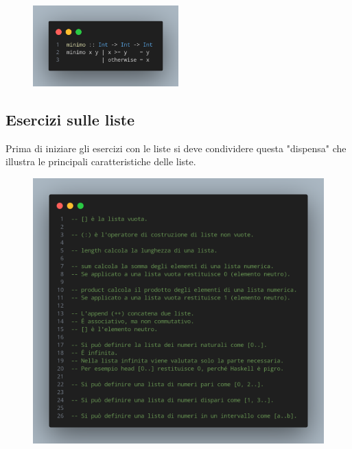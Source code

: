 \begin{figure}[!h]
    \centering
    \includegraphics[width=0.5\textwidth]{images/Minimo.png}
\end{figure}

\pagebreak

\subsection{Esercizi sulle liste}

Prima di iniziare gli esercizi con le liste si deve condividere questa "dispensa"
che illustra le principali caratteristiche delle liste.

\begin{figure}[!h]
    \centering
    \includegraphics[width=1\textwidth]{images/Dispensa liste.png}
\end{figure}

\pagebreak

